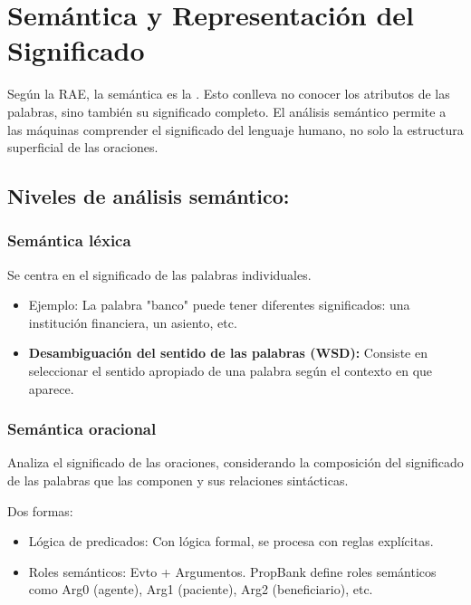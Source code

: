\documentclass{report}
\def\profundidadIndiceCapitulo{subsubsection}
\begin{document}
\chapter{Semántica y Representación del Significado}
\etocframedstyle[1]{}
\etocsetnexttocdepth{\profundidadIndiceCapitulo}
\localtableofcontents

Según la RAE, la semántica es la \autocite{rae.diccionario}.
Esto conlleva no conocer los atributos de las palabras, sino también su significado completo.
El análisis semántico permite a las máquinas comprender el significado del lenguaje humano, no solo la estructura superficial de las oraciones. 


\section{Niveles de análisis semántico:}

\subsection{Semántica léxica} 
Se centra en el significado de las palabras individuales.

\begin{itemize}
    \item Ejemplo: La palabra "banco" puede tener diferentes significados: una institución financiera, un asiento, etc.
    \item \textbf{Desambiguación del sentido de las palabras (WSD):} Consiste en seleccionar el sentido apropiado de una palabra según el contexto en que aparece.
\end{itemize}

\subsection{Semántica oracional}
Analiza el significado de las oraciones, considerando la composición del significado de las palabras que las componen y sus relaciones sintácticas.

Dos formas:
\begin{itemize}
    \item{Lógica de predicados:} Con lógica formal, se procesa con reglas explícitas.
    \item{Roles semánticos:} Evto + Argumentos. PropBank define roles semánticos como Arg0 (agente), Arg1 (paciente), Arg2 (beneficiario), etc.
\end{itemize}
\end{document}
